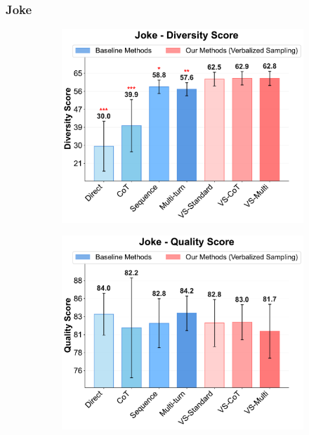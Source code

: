 \newpage
\subsubsection{Joke}
\begin{figure}[!htbp]
  \centering
  \begin{subfigure}[t]{0.48\textwidth}
      \centering
      \includegraphics[width=\textwidth]{figures/creative_writing/joke/joke_diversity_appendix.pdf}
      \label{fig:joke_creative_diversity}
  \end{subfigure}
  \hfill
  \begin{subfigure}[t]{0.48\textwidth}
      \centering
      \includegraphics[width=\textwidth]{figures/creative_writing/joke/joke_quality_appendix.pdf}

\end{subfigure}
\end{figure}
